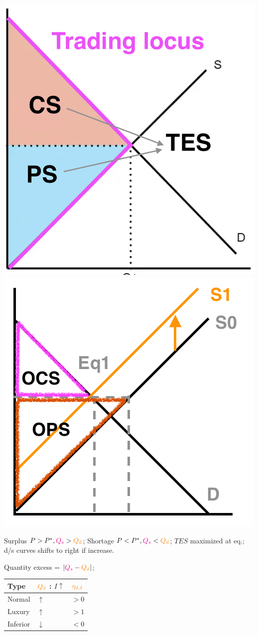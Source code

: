 \documentclass[a4paper]{article}
\begin{document}
\begin{multicols*}{3}
        \begin{minipage}{\linewidth}
            \includegraphics[width=0.4\linewidth]{./csps.png}
            \includegraphics[width=0.4\linewidth]{./csps2.jpg}
        \end{minipage}

        Surplus $P > P^*, \textcolor{magenta}{Q_s} > \textcolor{orange}{Q_d}$; Shortage $P < P^*, \textcolor{magenta}{Q_s} < \textcolor{orange}{Q_d}$; $TES$ maximized at eq.; d/s curves shifts to right if increase.

        Quantity excess = $|\textcolor{magenta}{Q_s} - \textcolor{orange}{Q_d}|$;

        \begin{minipage}{\linewidth}
            \begin{tabular}{l|l|l}
                Type     & $\textcolor{orange}{Q_d}$ : $I \uparrow$ & $\textcolor{orange}{\eta_{d,I}}$ \\
                \hline
                Normal   & $\uparrow$                               & $>0$                             \\
                Luxury   & $\uparrow$                               & $>1$                             \\
                Inferior & $\downarrow$                             & $<0$                             \\
            \end{tabular}
        \end{minipage}


\end{multicols*}
\end{document}
